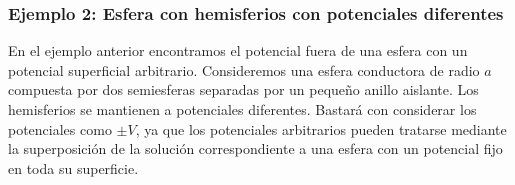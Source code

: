 \documentclass[]{article}
\numberwithin{equation}{section}
\begin{document}
\subsubsection{Ejemplo 2: Esfera con hemisferios con potenciales diferentes}
En el ejemplo anterior encontramos el potencial fuera de una esfera con un potencial superficial arbitrario. Consideremos una esfera conductora de radio \(a\) compuesta por dos semiesferas separadas por un pequeño anillo aislante. Los hemisferios se mantienen a potenciales diferentes. Bastará con considerar los potenciales como \(\pm V\), ya que los potenciales arbitrarios pueden tratarse mediante la superposición de la solución correspondiente a una esfera con un potencial fijo en toda su superficie. 
\begin{figure}[h!]
	\centering
	\begin{tikzpicture}[x=0.75pt,y=0.75pt,yscale=-1,xscale=1]
		

\end{tikzpicture}
\end{figure}
\end{document}
